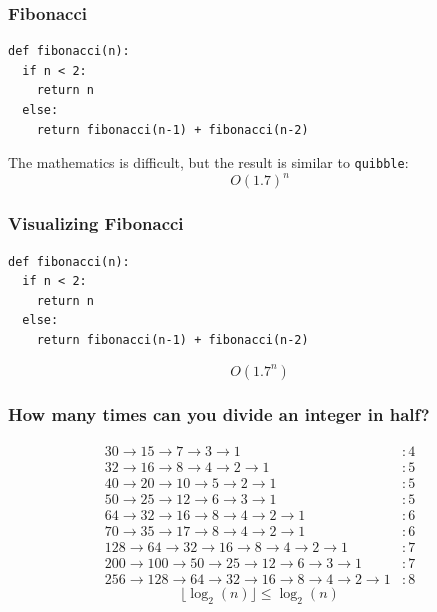 \documentclass{beamer}
\newcommand{\bfr}[1]{\begin{frame}[fragile]\frametitle{{ #1 }}}
\begin{document}
\bfr{Fibonacci}
\begin{lstlisting}
def fibonacci(n):
  if n < 2:
    return n
  else:
    return fibonacci(n-1) + fibonacci(n-2)
\end{lstlisting}
The mathematics is difficult, but the result is similar
to {\tt quibble}:
\[
 O(1.7)^n
\]
\end{frame}

\bfr{Visualizing Fibonacci}

\begin{lstlisting}
def fibonacci(n):
  if n < 2:
    return n
  else:
    return fibonacci(n-1) + fibonacci(n-2)
\end{lstlisting}
\[O(1.7^n)\]
\end{frame}

\bfr{How many times can you divide an integer in half?}

\begin{align*}
30 \rightarrow 15 \rightarrow 7 \rightarrow 3\rightarrow 1 &: 4
\\
32 \rightarrow 16 \rightarrow 8 \rightarrow 4
\rightarrow 2 \rightarrow 1 &:5
\\
40 \rightarrow 20 \rightarrow 10 \rightarrow 5
\rightarrow 2 \rightarrow 1 &:5
\\
50 \rightarrow 25 \rightarrow 12 \rightarrow 6
\rightarrow 3 \rightarrow 1 &:5
\\
64 \rightarrow 32 \rightarrow 16 \rightarrow 8 \rightarrow 4
\rightarrow 2 \rightarrow 1 &:6
\\
70 \rightarrow 35 \rightarrow 17 \rightarrow 8 \rightarrow 4
\rightarrow 2 \rightarrow 1 &:6\\
128\rightarrow 64 \rightarrow 32 \rightarrow 16 \rightarrow 8 \rightarrow 4
\rightarrow 2 \rightarrow 1 &:7\\
200\rightarrow 100 \rightarrow 50 \rightarrow 25 \rightarrow 12 \rightarrow 6
\rightarrow 3 \rightarrow 1 &:7\\
256\rightarrow 128\rightarrow 64 \rightarrow 32 \rightarrow 16 \rightarrow 8 \rightarrow 4
\rightarrow 2 \rightarrow 1 &:8
\end{align*}
\pause
\[
\lfloor\log_2(n)\rfloor \leq \log_2(n)
\]
\end{frame}
\end{document}
